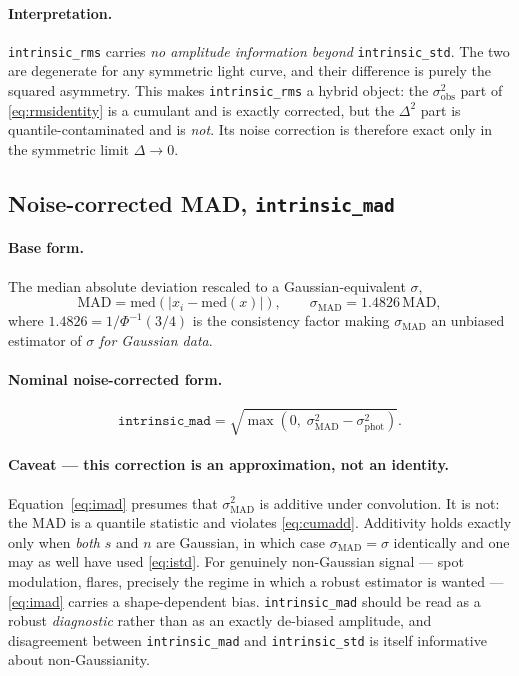 \documentclass[11pt]{article}
\newcommand{\istd}{\texttt{intrinsic\_std}}
\newcommand{\irms}{\texttt{intrinsic\_rms}}
\newcommand{\imad}{\texttt{intrinsic\_mad}}
\newcommand{\sigobs}{\sigma_{\mathrm{obs}}}
\newcommand{\sigphot}{\sigma_{\mathrm{phot}}}
\begin{document}
\paragraph{Interpretation.} \irms{} carries \emph{no amplitude information beyond}
\istd. The two are degenerate for any symmetric light curve, and their difference
is purely the squared asymmetry. This makes \irms{} a hybrid object: the
$\sigobs^2$ part of \eqref{eq:rmsidentity} is a cumulant and is exactly
corrected, but the $\Delta^2$ part is quantile-contaminated and is \emph{not}.
Its noise correction is therefore exact only in the symmetric limit
$\Delta \to 0$.

\subsection{Noise-corrected MAD, \imad}
\label{sec:mad}

\paragraph{Base form.} The median absolute deviation rescaled to a
Gaussian-equivalent $\sigma$,
%
\begin{equation}
  \mathrm{MAD} = \mathrm{med}\left(\left|x_i - \mathrm{med}(x)\right|\right),
  \qquad
  \sigma_{\mathrm{MAD}} = 1.4826\,\mathrm{MAD},
  \label{eq:mad}
\end{equation}
%
where $1.4826 = 1/\Phi^{-1}(3/4)$ is the consistency factor making
$\sigma_{\mathrm{MAD}}$ an unbiased estimator of $\sigma$ \emph{for Gaussian
data}.

\paragraph{Nominal noise-corrected form.}
%
\begin{equation}
  \imad = \sqrt{\max\!\left(0,\;\sigma_{\mathrm{MAD}}^{2}
                            - \sigphot^{2}\right)} .
  \label{eq:imad}
\end{equation}

\paragraph{Caveat --- this correction is an approximation, not an identity.}
Equation~\eqref{eq:imad} presumes that $\sigma_{\mathrm{MAD}}^2$ is additive
under convolution. It is not: the MAD is a quantile statistic and violates
\eqref{eq:cumadd}. Additivity holds exactly only when \emph{both} $s$ and $n$
are Gaussian, in which case $\sigma_{\mathrm{MAD}} = \sigma$ identically and one
may as well have used \eqref{eq:istd}. For genuinely non-Gaussian signal --- spot
modulation, flares, precisely the regime in which a robust estimator is wanted ---
\eqref{eq:imad} carries a shape-dependent bias. \imad{} should be read as a
robust \emph{diagnostic} rather than as an exactly de-biased amplitude, and
disagreement between \imad{} and \istd{} is itself informative about
non-Gaussianity.
\end{document}
